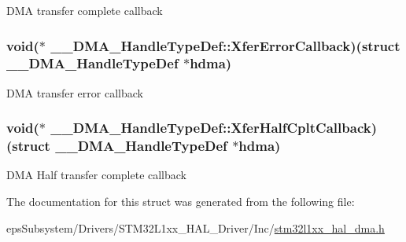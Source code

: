 D\-M\-A transfer complete callback \hypertarget{struct_____d_m_a___handle_type_def_aa9c22cf22623f4a9cff0346eb38aa157}{
\subsubsection[{Xfer\-Error\-Callback}]{\setlength{\rightskip}{0pt plus 5cm}void($\ast$  \-\_\-\-\_\-\-D\-M\-A\-\_\-\-Handle\-Type\-Def\-::\-Xfer\-Error\-Callback)(struct {\bf \-\_\-\-\_\-\-D\-M\-A\-\_\-\-Handle\-Type\-Def} $\ast$hdma)}}\label{struct_____d_m_a___handle_type_def_aa9c22cf22623f4a9cff0346eb38aa157}
D\-M\-A transfer error callback \hypertarget{struct_____d_m_a___handle_type_def_ae28485fb5491c719ac0d765d40eb8ed7}{
\subsubsection[{Xfer\-Half\-Cplt\-Callback}]{\setlength{\rightskip}{0pt plus 5cm}void($\ast$  \-\_\-\-\_\-\-D\-M\-A\-\_\-\-Handle\-Type\-Def\-::\-Xfer\-Half\-Cplt\-Callback)(struct {\bf \-\_\-\-\_\-\-D\-M\-A\-\_\-\-Handle\-Type\-Def} $\ast$hdma)}}\label{struct_____d_m_a___handle_type_def_ae28485fb5491c719ac0d765d40eb8ed7}
D\-M\-A Half transfer complete callback 

The documentation for this struct was generated from the following file\-:\begin{DoxyCompactItemize}
\item 
eps\-Subsystem/\-Drivers/\-S\-T\-M32\-L1xx\-\_\-\-H\-A\-L\-\_\-\-Driver/\-Inc/\hyperlink{stm32l1xx__hal__dma_8h}{stm32l1xx\-\_\-hal\-\_\-dma.\-h}\end{DoxyCompactItemize}
